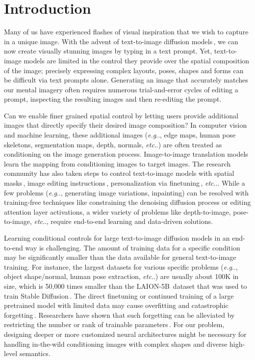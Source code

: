 \documentclass[10pt,twocolumn,letterpaper]{article}
\makeatletter
\DeclareRobustCommand\onedot{\futurelet\@let@token\@onedot}
\def\@onedot{\ifx\@let@token.\else.\null\fi\xspace}
\def\eg{\emph{e.g}\onedot}
\def\etc{\emph{etc}\onedot}
\makeatother
\begin{document}
	\section{Introduction}
	\label{sec:intro}
	Many of us have experienced flashes of visual inspiration that
	we wish to capture in a unique image.  With the advent of
	text-to-image diffusion
	models\,\cite{midjourney,DALLE2,rombach2021highresolution}, we
	can now create visually stunning images by typing in a text
	prompt. 
	Yet, text-to-image models are limited in the control
	they provide over the spatial composition of the image;
	precisely expressing complex layouts, poses, shapes and forms
	can be difficult via text prompts alone.
	Generating an image
	that accurately matches our mental imagery often requires numerous
	trial-and-error cycles of editing a prompt, inspecting the
	resulting images and then re-editing the prompt.
	
	Can we enable finer grained spatial control by letting users
	provide additional images that directly specify their desired
	image composition?
	In computer
	vision and machine learning, these additional images (\eg,
	edge maps, human pose skeletons, segmentation maps, depth,
	normals, \etc) are often treated as conditioning on the image
	generation process.  Image-to-image translation
	models\,\cite{isola2017image,CycleGAN2017} learn the mapping
	from conditioning images to target images.  The research
	community has also taken steps to control text-to-image models
	with spatial masks\,\cite{avrahami2022spatext,gafni2022make},
	image editing instructions\,\cite{brooks2022instructpix2pix},
	personalization via
	finetuning\,\cite{gal2022image,ruiz2022dreambooth}, \etc. While
	a few problems (\eg, generating image variations,
	inpainting) can be resolved with training-free techniques like
	constraining the denoising diffusion process or editing
	attention layer activations, a wider variety of problems like
	depth-to-image, pose-to-image, \etc, require end-to-end
	learning and data-driven solutions.
	
	Learning conditional controls for large text-to-image
	diffusion models in an end-to-end way is challenging.  The
	amount of training data for a specific condition may be
	significantly smaller than the data available for general
	text-to-image training. For instance, the largest datasets
	for various specific problems (\eg, object shape/normal, human
	pose extraction, \etc) are usually about 100K in size, which
	is 50,000 times smaller than the
	LAION-5B\,\cite{schuhmann2022laionb} dataset that was used to
	train Stable Diffusion\,\cite{sd15}. The direct finetuning or
	continued training of a large pretrained model with limited
	data may cause overfitting and catastrophic
	forgetting\,\cite{hu2021lora,ruiz2022dreambooth}.
	Researchers have shown that such forgetting can be alleviated by restricting the number or rank of trainable parameters\,\cite{chen2022vision,ha2017hypernetworks,hu2021lora,zhang2020side}.
	For our problem, designing deeper or more customized neural architectures might be necessary for handling in-the-wild conditioning images with complex shapes and diverse high-level semantics.
	
\end{document}
